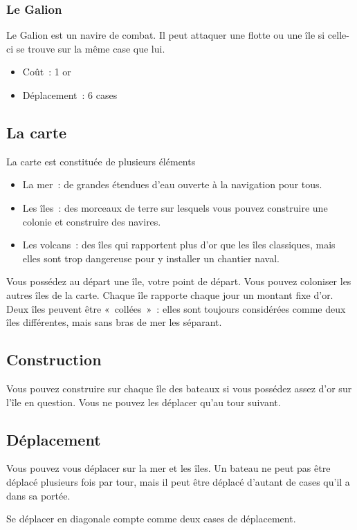\subsubsection{Le Galion}
Le Galion est un navire de combat. Il peut attaquer une flotte ou une île si
celle-ci se trouve sur la même case que lui.
\begin{itemize}
	\item Coût~: 1 or
	\item Déplacement~: 6 cases
\end{itemize}

\subsection{La carte}
La carte est constituée de plusieurs éléments
\begin{itemize}
	\item La mer~: de grandes étendues d'eau ouverte à la navigation pour tous.
	\item Les îles~: des morceaux de terre sur lesquels vous pouvez construire une
		colonie et construire des navires.
	\item Les volcans~: des îles qui rapportent plus d'or que les îles classiques, mais
		elles sont trop dangereuse pour y installer un chantier naval.
\end{itemize}

Vous possédez au départ une île, votre point de départ. Vous pouvez coloniser
les autres îles de la carte.
Chaque île rapporte chaque jour un montant fixe d'or.
Deux îles peuvent être «~collées~»~: elles sont toujours considérées comme deux
îles différentes, mais sans bras de mer les séparant.

\subsection{Construction}
Vous pouvez construire sur chaque île des bateaux si vous possédez assez d'or
sur l'île en question. Vous ne pouvez les déplacer qu'au tour suivant.

\subsection{Déplacement}
Vous pouvez vous déplacer sur la mer et les îles. Un bateau ne peut
pas être déplacé plusieurs fois par tour, mais il peut être déplacé d'autant de
cases qu'il a dans sa portée.

Se déplacer en diagonale compte comme deux cases de déplacement.

